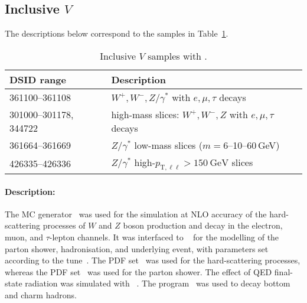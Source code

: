 \subsection[Inclusive Powheg $V$]{Inclusive \POWHEG $V$}

The descriptions below correspond to the samples in Table~\ref{tab:v-powheg}.

\begin{table}[!htbp]
  \caption{Inclusive $V$ samples with \POWHEG.}%
  \label{tab:v-powheg}
  \centering
  \begin{tabular}{l l}
    \toprule
    DSID range & Description \\
    \midrule
    361100--361108    & $W^+,W^-,Z/\gamma^\ast$ with $e,\mu,\tau$ decays\\
    301000--301178, 344722    & high-mass slices: $W^+,W^-,Z$ with $e,\mu,\tau$ decays \\
    361664--361669 & $Z/\gamma^\ast$ low-mass slices ($m=6$--10--60\,\si{\GeV})\\
    426335--426336 & $Z/\gamma^\ast$ high-$p_{\text{T},\ell\ell} > \SI{150}{\GeV}$ slices \\
    \bottomrule
  \end{tabular}
\end{table}

\paragraph{Description:}

The \POWHEGBOX[v1] MC generator~\cite{Nason:2004rx,Frixione:2007vw,Alioli:2010xd,Alioli:2008gx}
was used for the simulation at NLO accuracy of the hard-scattering processes of $W$
and $Z$ boson production and decay in the electron, muon, and $\tau$-lepton
channels. It was interfaced to \PYTHIA[8.186]~\cite{Sjostrand:2007gs}
for the modelling of the parton shower, hadronisation, and underlying
event, with parameters set according to the \AZNLO
tune~\cite{STDM-2012-23}. The \CT[10nlo] PDF set~\cite{Lai:2010vv} was used
for the hard-scattering processes, whereas the \CTEQ[6L1] PDF
set~\cite{Pumplin:2002vw} was used for the parton shower. The effect of
QED final-state radiation was simulated with \PHOTOSpp[3.52]~\cite{Golonka:2005pn,Davidson:2010ew}. 
The \EVTGEN[1.2.0] program~\cite{Lange:2001uf} was used to decay bottom and charm hadrons.


